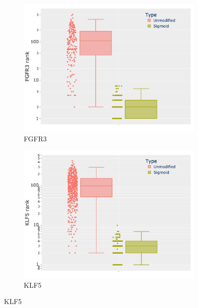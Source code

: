 \begin{figure}[!t]
    \centering
    \begin{subfigure}{0.49\linewidth}
        \includegraphics[width=1.0\textwidth,height=1.0\textheight,keepaspectratio]{Sections/Network_II/resources/reward/corr_analysis/FGFR3_box.png}
        \caption{FGFR3}
        \label{fig:N_II:fgfr3_corr}
    \end{subfigure}
    \begin{subfigure}{0.49\linewidth}
        \includegraphics[width=1.0\textwidth,height=1.0\textheight,keepaspectratio]{Sections/Network_II/resources/reward/corr_analysis/KLF5_box.png}
        \caption{KLF5}
        \label{fig:N_II:klf5_corr}
    \end{subfigure}

\end{figure}

